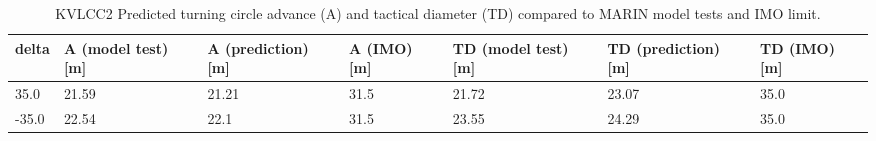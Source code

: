 \begin{table}[h]
    \centering
    \footnotesize
        \caption{KVLCC2 Predicted turning circle advance (A) and tactical diameter (TD) compared to MARIN model tests and IMO limit.}
    \label{\detokenize{06.20_results_kvlcc2:tab-kvlcc2-advance}}
    \begin{tabular}{|p{0.7cm}|p{1.7cm}|p{1.3cm}|p{1.0cm}|p{1.3cm}|p{1.3cm}|p{1.0cm}|}
\hline
\sphinxstyletheadfamily 

delta
&\sphinxstyletheadfamily 

A (model test) {[}m{]}
&\sphinxstyletheadfamily 

A (prediction) {[}m{]}
&\sphinxstyletheadfamily 

A (IMO) {[}m{]}
&\sphinxstyletheadfamily 

TD (model test) {[}m{]}
&\sphinxstyletheadfamily 

TD (prediction) {[}m{]}
&\sphinxstyletheadfamily 

TD (IMO) {[}m{]}
\\
\hline

35.0
&

21.59
&

21.21
&

31.5
&

21.72
&

23.07
&

35.0
\\


-35.0
&

22.54
&

22.1
&

31.5
&

23.55
&

24.29
&

35.0
\\
\hline
\end{tabular}
\end{table}
